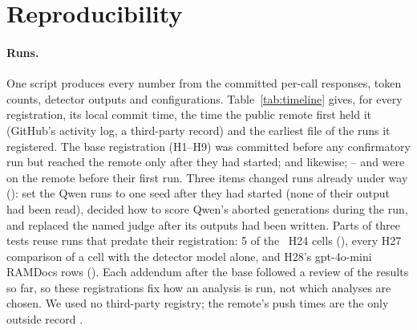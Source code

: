 \clearpage
\section{Reproducibility}
\label{app:repro}
\paragraph{Runs.} One script produces every number from the committed per-call responses,
token counts, detector outputs and configurations. Table~\ref{tab:timeline} gives, for every registration, its local
commit time, the time the public remote first held it (GitHub's activity log, a third-party record) and the earliest
file of the runs it registered. The base registration (H1--H9) was committed before any confirmatory run but reached
the remote only after they had started;  and  likewise; -- and  were on the
remote before their first run. Three items changed runs already under way ():  set the Qwen runs to
one seed after they had started (none of their output had been read),  decided how to score Qwen's aborted
generations during the run, and  replaced the named judge after its outputs had been written. Parts of
three tests reuse runs that predate their registration: 5 of the \hTwentyFourCells\ H24 cells (), every H27
comparison of a cell with the detector model alone, and H28's gpt-4o-mini RAMDocs rows (). Each addendum
after the base followed a review of the results so far, so these registrations fix how an analysis is run, not which
analyses are chosen. We used no third-party registry; the remote's push times are the only outside record
\citep{vanmiltenburg2021preregistering}.



